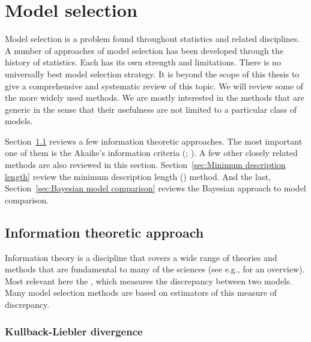 \chapter{Model selection}
\label{cha:Model selection}

Model selection is a problem found throughout statistics and related
disciplines. A number of approaches of model selection has been developed
through the history of statistics. Each has its own strength and limitations.
There is no universally best model selection strategy. It is beyond the scope
of this thesis to give a comprehensive and systematic review of this topic. We
will review some of the more widely used methods. We are mostly interested in
the methods that are generic in the sense that their usefulness are not
limited to a particular class of models.

Section~\ref{sec:Information theoretic approach} reviews a few information
theoretic approaches. The most important one of them is the Akaike's
information criteria (\aic; \cite{Akaike:1973uc,Akaike:1974ih}). A few other
closely related methods are also reviewed in this section.
Section~\ref{sec:Minimum description length} review the minimum description
length (\mdl) method. And the last, Section~\ref{sec:Bayesian model
  comparison} reviews the Bayesian approach to model comparison.

\section{Information theoretic approach}
\label{sec:Information theoretic approach}

Information theory is a discipline that covers a wide range of theories and
methods that are fundamental to many of the sciences (see e.g.,
\cite{Cover:1991vx} for an overview). Most relevant here the \kld
\cite{Kullback:1951va}, which measures the discrepancy between two models.
Many model selection methods are based on estimators of this measure of
discrepancy.

\subsection{Kullback-Liebler divergence}
\label{sub:Kullback-Liebler divergence}

